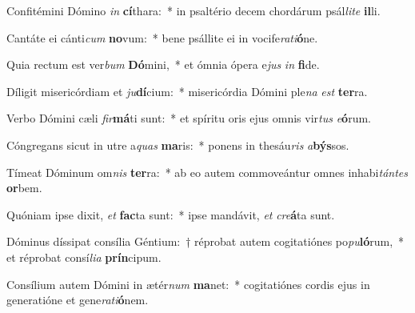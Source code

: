 \item Confitémini Dómino \textit{in} \textbf{cí}thara:~* in psaltério decem chordárum psál\textit{li}\textit{te} \textbf{il}li.
\item Cantáte ei cánti\textit{cum} \textbf{no}vum:~* bene psállite ei in vocife\textit{ra}\textit{ti}\textbf{ó}ne.
\item Quia rectum est ver\textit{bum} \textbf{Dó}mini,~* et ómnia ópera e\textit{jus} \textit{in} \textbf{fi}de.
\item Díligit misericórdiam et \textit{ju}\textbf{dí}cium:~* misericórdia Dómini ple\textit{na} \textit{est} \textbf{ter}ra.
\item Verbo Dómini cæli \textit{fir}\textbf{má}ti sunt:~* et spíritu oris ejus omnis vir\textit{tus} \textit{e}\textbf{ó}rum.
\item Cóngregans sicut in utre a\textit{quas} \textbf{ma}ris:~* ponens in thesáu\textit{ris} \textit{a}\textbf{býs}sos.
\item Tímeat Dóminum om\textit{nis} \textbf{ter}ra:~* ab eo autem commoveántur omnes inhabi\textit{tán}\textit{tes} \textbf{or}bem.
\item Quóniam ipse dixit, \textit{et} \textbf{fac}ta sunt:~* ipse mandávit, \textit{et} \textit{cre}\textbf{á}ta sunt.
\item Dóminus díssipat consília Géntium:~† réprobat autem cogitatiónes po\textit{pu}\textbf{ló}rum,~* et réprobat consí\textit{li}\textit{a} \textbf{prín}cipum.
\item Consílium autem Dómini in ætér\textit{num} \textbf{ma}net:~* cogitatiónes cordis ejus in generatióne et gene\textit{ra}\textit{ti}\textbf{ó}nem.
